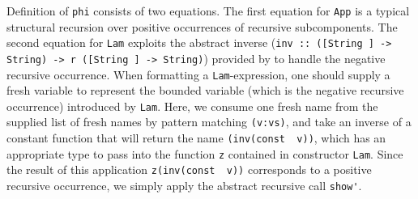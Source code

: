 Definition of \lstinline{phi} consists of two equations.
The first equation for \lstinline{App} is a typical structural recursion
over positive occurrences of recursive subcomponents. The second equation
for \lstinline{Lam} exploits the abstract inverse
(\lstinline{inv :: ([String ] -> String) -> r ([String ] -> String)})
provided by \msfit{} to handle the negative recursive occurrence.
When formatting a \lstinline{Lam}-expression, one should supply a fresh variable
to represent the bounded variable (which is the negative recursive occurrence)
introduced by \lstinline{Lam}. Here, we consume one fresh name from the supplied
list of fresh names by pattern matching \lstinline{(v:vs)}, and take an inverse
of a constant function that will return the name \lstinline{(inv(const  v))},
which has an appropriate type to pass into the function \lstinline{z} contained
in constructor \lstinline{Lam}. Since the result of this application
\lstinline{z(inv(const  v))} corresponds to a positive recursive occurrence,
we simply apply the abstract recursive call \lstinline{show'}.

